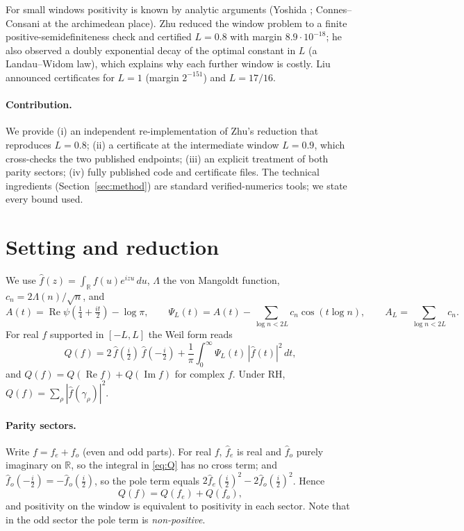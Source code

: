 \documentclass[11pt,a4paper]{article}
\theoremstyle{remark}
\theoremstyle{definition}
\renewcommand{\Re}{\operatorname{Re}}
\renewcommand{\Im}{\operatorname{Im}}
\begin{document}
For small windows positivity is known by analytic arguments (Yoshida \cite{Yoshida92}; Connes--Consani \cite{CC21} at the archimedean place). Zhu \cite{Zhu26} reduced the window problem to a finite positive-semidefiniteness check and certified $L=0.8$ with margin $8.9\cdot10^{-18}$; he also observed a doubly exponential decay of the optimal constant in $L$ (a Landau--Widom law), which explains why each further window is costly. Liu \cite{Liu26} announced certificates for $L=1$ (margin $2^{-151}$) and $L=17/16$.

\paragraph{Contribution.} We provide (i) an independent re-implementation of Zhu's reduction that reproduces $L=0.8$; (ii) a certificate at the intermediate window $L=0.9$, which cross-checks the two published endpoints; (iii) an explicit treatment of both parity sectors; (iv) fully published code and certificate files. The technical ingredients (Section~\ref{sec:method}) are standard verified-numerics tools; we state every bound used.

\section{Setting and reduction}\label{sec:setting}

We use $\hat f(z)=\int_{\mathbb R} f(u)e^{izu}\,du$, $\Lambda$ the von Mangoldt function, $c_n=2\Lambda(n)/\sqrt n$, and
\[
A(t)=\Re\psi\!\left(\tfrac14+\tfrac{it}2\right)-\log\pi,\qquad
\Psi_L(t)=A(t)-\sum_{\log n<2L}c_n\cos(t\log n),\qquad A_L=\sum_{\log n<2L}c_n .
\]
For real $f$ supported in $[-L,L]$ the Weil form reads
\begin{equation}\label{eq:Q}
Q(f)=2\,\hat f(\tfrac i2)\,\hat f(-\tfrac i2)+\frac1\pi\int_0^\infty \Psi_L(t)\,|\hat f(t)|^2\,dt ,
\end{equation}
and $Q(f)=Q(\Re f)+Q(\Im f)$ for complex $f$. Under RH, $Q(f)=\sum_\rho|\hat f(\gamma_\rho)|^2$.

\paragraph{Parity sectors.} Write $f=f_e+f_o$ (even and odd parts). For real $f$, $\hat f_e$ is real and $\hat f_o$ purely imaginary on $\mathbb R$, so the integral in \eqref{eq:Q} has no cross term; and $\hat f_o(-\tfrac i2)=-\hat f_o(\tfrac i2)$, so the pole term equals $2\hat f_e(\tfrac i2)^2-2\hat f_o(\tfrac i2)^2$. Hence
\[
Q(f)=Q(f_e)+Q(f_o),
\]
and positivity on the window is equivalent to positivity in each sector. Note that in the odd sector the pole term is \emph{non-positive}.
\end{document}
